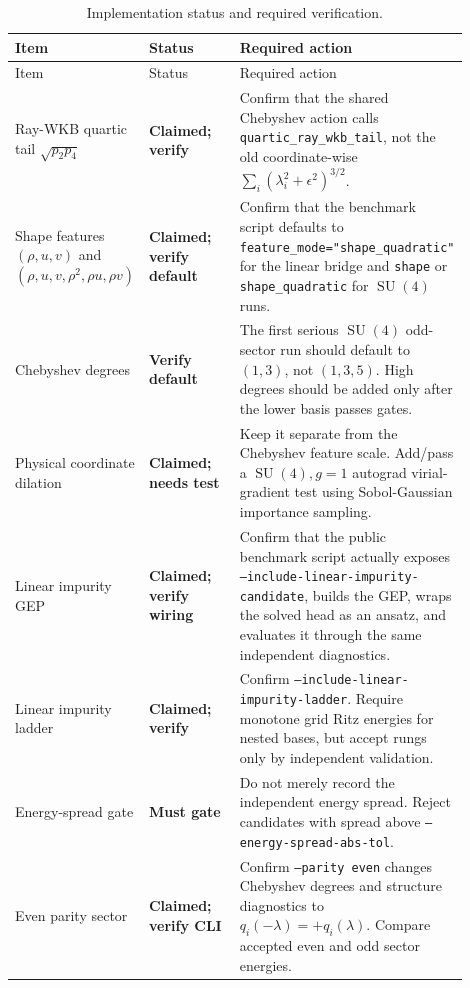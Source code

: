 \documentclass[11pt]{article}
\newcommand{\SU}{\operatorname{SU}}
\newcommand{\status}[2]{\textbf{\textcolor{#1}{#2}}}
\begin{document}
\begin{small}
\begin{longtable}{p{0.23\linewidth}p{0.20\linewidth}p{0.47\linewidth}}
\caption{Implementation status and required verification.}\label{tab:status}\\
\toprule
Item & Status & Required action \\
\midrule
\endfirsthead
\toprule
Item & Status & Required action \\
\midrule
\endhead
Ray-WKB quartic tail \(\sqrt{p_2p_4}\) & \status{statusgreen}{Claimed; verify} & Confirm that the shared Chebyshev action calls \texttt{quartic\_ray\_wkb\_tail}, not the old coordinate-wise \(\sum_i(\lambda_i^2+\epsilon^2)^{3/2}\). \\
\addlinespace
Shape features \((\rho,u,v)\) and \((\rho,u,v,\rho^2,\rho u,\rho v)\) & \status{statusgreen}{Claimed; verify default} & Confirm that the benchmark script defaults to \texttt{feature\_mode="shape\_quadratic"} for the linear bridge and \texttt{shape} or \texttt{shape\_quadratic} for \(\SU(4)\) runs. \\
\addlinespace
Chebyshev degrees & \status{statusorange}{Verify default} & The first serious \(\SU(4)\) odd-sector run should default to \((1,3)\), not \((1,3,5)\). High degrees should be added only after the lower basis passes gates. \\
\addlinespace
Physical coordinate dilation & \status{statusgreen}{Claimed; needs test} & Keep it separate from the Chebyshev feature scale. Add/pass a \(\SU(4),g=1\) autograd virial-gradient test using Sobol-Gaussian importance sampling. \\
\addlinespace
Linear impurity GEP & \status{statusgreen}{Claimed; verify wiring} & Confirm that the public benchmark script actually exposes \texttt{--include-linear-impurity-candidate}, builds the GEP, wraps the solved head as an ansatz, and evaluates it through the same independent diagnostics. \\
\addlinespace
Linear impurity ladder & \status{statusgreen}{Claimed; verify} & Confirm \texttt{--include-linear-impurity-ladder}. Require monotone grid Ritz energies for nested bases, but accept rungs only by independent validation. \\
\addlinespace
Energy-spread gate & \status{statusorange}{Must gate} & Do not merely record the independent energy spread. Reject candidates with spread above \texttt{--energy-spread-abs-tol}. \\
\addlinespace
Even parity sector & \status{statusgreen}{Claimed; verify CLI} & Confirm \texttt{--parity even} changes Chebyshev degrees and structure diagnostics to \(q_i(-\lambda)=+q_i(\lambda)\). Compare accepted even and odd sector energies. \\

\end{longtable}
\end{small}
\end{document}
